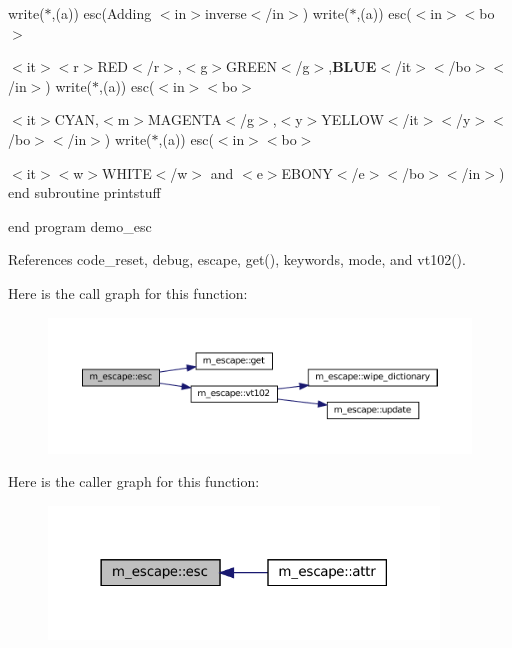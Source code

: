write($\ast$,\textquotesingle{}(a)\textquotesingle{}) esc(\textquotesingle{}Adding $<$in$>$inverse$<$/in$>$\textquotesingle{}) write($\ast$,\textquotesingle{}(a)\textquotesingle{}) esc(\textquotesingle{}$<$in$>$$<$bo$>$
\begin{DoxyItemize}
\item 
\end{DoxyItemize}$<$it$>$$<$r$>$R\+ED$<$/r$>$,$<$g$>$G\+R\+E\+EN$<$/g$>$,{\bfseries B\+L\+UE}$<$/it$>$$<$/bo$>$$<$/in$>$\textquotesingle{}) write($\ast$,\textquotesingle{}(a)\textquotesingle{}) esc(\textquotesingle{}$<$in$>$$<$bo$>$
\begin{DoxyItemize}
\item 
\end{DoxyItemize}$<$it$>${\ttfamily C\+Y\+AN},$<$m$>$M\+A\+G\+E\+N\+TA$<$/g$>$,$<$y$>$Y\+E\+L\+L\+OW$<$/it$>$$<$/y$>$$<$/bo$>$$<$/in$>$\textquotesingle{}) write($\ast$,\textquotesingle{}(a)\textquotesingle{}) esc(\textquotesingle{}$<$in$>$$<$bo$>$
\begin{DoxyItemize}
\item 
\end{DoxyItemize}$<$it$>$$<$w$>$W\+H\+I\+TE$<$/w$>$ and $<$e$>$E\+B\+O\+NY$<$/e$>$$<$/bo$>$$<$/in$>$\textquotesingle{}) end subroutine printstuff

end program demo\+\_\+esc 

References code\+\_\+reset, debug, escape, get(), keywords, mode, and vt102().

Here is the call graph for this function\+:\nopagebreak
\begin{figure}[H]
\begin{center}
\leavevmode
\includegraphics[width=350pt]{namespacem__escape_a36f016baad6b23f86189e6f3ee6db0cb_cgraph}
\end{center}
\end{figure}
Here is the caller graph for this function\+:\nopagebreak
\begin{figure}[H]
\begin{center}
\leavevmode
\includegraphics[width=294pt]{namespacem__escape_a36f016baad6b23f86189e6f3ee6db0cb_icgraph}
\end{center}
\end{figure}
\mbox{\label{namespacem__escape_a4210456d81d9a1bf328093a9635e640b}} 
